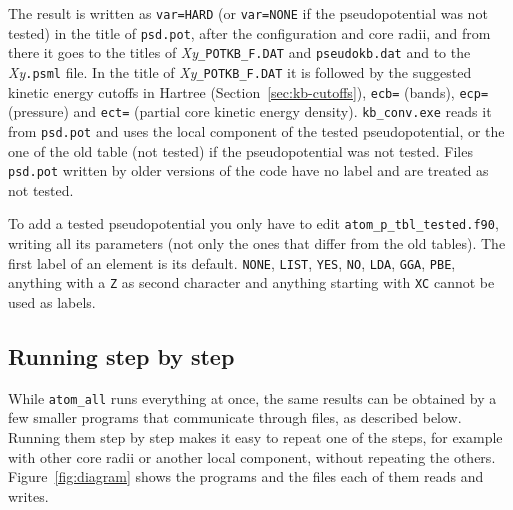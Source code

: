 \documentclass[11pt]{article}
\begin{document}
The result is written as \texttt{var=HARD} (or \texttt{var=NONE} if the pseudopotential
was not tested) in the title of \texttt{psd.pot}, after the configuration and core radii,
and from there it goes to the titles of \textit{Xy}\texttt{\_POTKB\_F.DAT} and
\texttt{pseudokb.dat} and to the \textit{Xy}\texttt{.psml} file.
In the title of \textit{Xy}\texttt{\_POTKB\_F.DAT} it is followed by the suggested
kinetic energy cutoffs in Hartree (Section~\ref{sec:kb-cutoffs}),
\texttt{ecb=} (bands), \texttt{ecp=} (pressure) and \texttt{ect=} (partial core kinetic energy density).
\texttt{kb\_conv.exe} reads it from \texttt{psd.pot} and uses the local component of the
tested pseudopotential, or the one of the old table (not tested) if the
pseudopotential was not tested.
Files \texttt{psd.pot} written by older versions of the code have no label and are
treated as not tested.

To add a tested pseudopotential you only have to edit
\texttt{atom\_p\_tbl\_tested.f90}, writing all its parameters (not only the ones that
differ from the old tables).  The first label of an element is its default.
\texttt{NONE}, \texttt{LIST}, \texttt{YES}, \texttt{NO}, \texttt{LDA}, \texttt{GGA},
\texttt{PBE}, anything with a \texttt{Z} as second character and anything starting
with \texttt{XC} cannot be used as labels.


\subsection{Running step by step}
\label{sec:run-steps}

While \texttt{atom\_all} runs everything at once, the same results can be obtained by a few
smaller programs that communicate through files, as described below.
Running them step by step makes it easy to repeat one of the steps, for example
with other core radii or another local component, without repeating the others.
Figure~\ref{fig:diagram} shows the programs and the files each of them reads
and writes.
\end{document}
